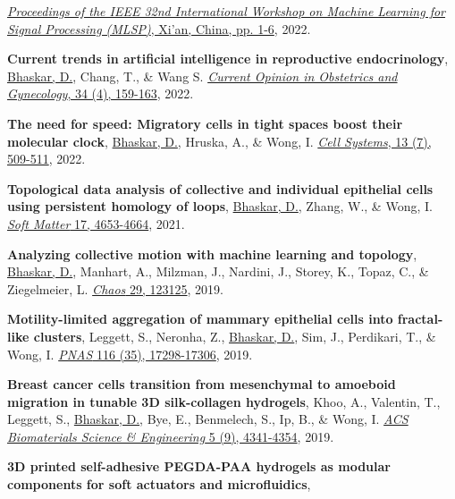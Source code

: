 \documentclass[margin,line]{res}
\begin{document}
\begin{resume}
{\begin{etaremune}[start=14]
\href{https://doi.org/10.1109/MLSP55214.2022.9943379}{\textit{Proceedings of the IEEE 32nd International Workshop on Machine Learning for Signal Processing (MLSP)}, Xi'an, China, pp. 1-6}, 2022.
\vspace*{.1cm}
\item{\bf Current trends in artificial intelligence in reproductive endocrinology},
\underline{Bhaskar, D.}, Chang, T., \& Wang S.
\href{https://doi.org/10.1097/GCO.0000000000000796}{\textit{Current Opinion in Obstetrics and Gynecology}, 34 (4), 159-163}, 2022.
\vspace*{.1cm}
\item{\bf The need for speed: Migratory cells in tight spaces boost their molecular clock},
\underline{Bhaskar, D.}, Hruska, A., \& Wong, I.
\href{https://doi.org/10.1016/j.cels.2022.06.002}{\textit{Cell Systems}, 13 (7), 509-511}, 2022.
\vspace*{.1cm}
\item{\bf Topological data analysis of collective and individual epithelial cells using persistent homology of loops}, 
\underline{Bhaskar, D.}, Zhang, W., \& Wong, I. 
\href{https://doi.org/10.1039/D1SM00072A}{\textit{Soft Matter} 17, 4653-4664}, 2021.
\vspace*{.1cm}
\item{\bf Analyzing collective motion with machine learning and topology}, 
\underline{Bhaskar, D.}, Manhart, A., Milzman, J., Nardini, J., Storey, K., Topaz, C., \& Ziegelmeier, L. 
\href{https://aip.scitation.org/doi/10.1063/1.5125493}{\textit{Chaos} 29, 123125}, 2019.
\vspace*{.1cm}
\item{\bf Motility-limited aggregation of mammary epithelial cells into fractal-like clusters}, 
Leggett, S., Neronha, Z., \underline{Bhaskar, D.}, Sim, J., Perdikari, T., \& Wong, I. 
\href{https://www.pnas.org/content/116/35/17298.short}{\textit{PNAS} 116 (35), 17298-17306}, 2019.
\item{\bf Breast cancer cells transition from mesenchymal to amoeboid migration in tunable 3D silk-collagen hydrogels},
Khoo, A., Valentin, T., Leggett, S., \underline{Bhaskar, D.}, Bye, E., Benmelech, S., Ip, B., \& Wong, I. 
\href{https://pubs.acs.org/doi/abs/10.1021/acsbiomaterials.9b00519}{\textit{ACS Biomaterials Science \& Engineering} 5 (9), 4341-4354}, 2019.
\vspace*{.1cm}
\item{\bf 3D printed self-adhesive PEGDA-PAA hydrogels as modular components for soft actuators and microfluidics}, 

\end{etaremune}}
\end{resume}
\end{document}

